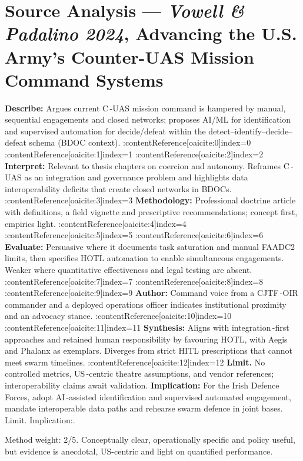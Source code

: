 \section*{Source Analysis — \textit{Vowell \& Padalino 2024}, Advancing the U.S. Army’s Counter-UAS Mission Command Systems}
\textbf{Describe:} Argues current C\,-UAS mission command is hampered by manual, sequential engagements and closed networks; proposes AI/ML for identification and supervised automation for decide/defeat within the detect–identify–decide–defeat schema (BDOC context). {\small :contentReference[oaicite:0]{index=0} :contentReference[oaicite:1]{index=1} :contentReference[oaicite:2]{index=2}}  
\textbf{Interpret:} Relevant to thesis chapters on coercion and autonomy. Reframes C\,-UAS as an integration and governance problem and highlights data interoperability deficits that create closed networks in BDOCs. {\small :contentReference[oaicite:3]{index=3}}  
\textbf{Methodology:} Professional doctrine article with definitions, a field vignette and prescriptive recommendations; concept first, empirics light. {\small :contentReference[oaicite:4]{index=4} :contentReference[oaicite:5]{index=5} :contentReference[oaicite:6]{index=6}}  
\textbf{Evaluate:} Persuasive where it documents task saturation and manual FAADC2 limits, then specifies HOTL automation to enable simultaneous engagements. Weaker where quantitative effectiveness and legal testing are absent. {\small :contentReference[oaicite:7]{index=7} :contentReference[oaicite:8]{index=8} :contentReference[oaicite:9]{index=9}}  
\textbf{Author:} Command voice from a CJTF\,-OIR commander and a deployed operations officer indicates institutional proximity and an advocacy stance. {\small :contentReference[oaicite:10]{index=10} :contentReference[oaicite:11]{index=11}}  
\textbf{Synthesis:} Aligns with integration\,-first approaches and retained human responsibility by favouring HOTL, with Aegis and Phalanx as exemplars. Diverges from strict HITL prescriptions that cannot meet swarm timelines. {\small :contentReference[oaicite:12]{index=12}}  
\textbf{Limit.} No controlled metrics, US\,-centric theatre assumptions, and vendor references; interoperability claims await validation.  
\textbf{Implication:} For the Irish Defence Forces, adopt AI\,-assisted identification and supervised automated engagement, mandate interoperable data paths and rehearse swarm defence in joint bases. Limit. Implication:.


Method weight: 2/5. Conceptually clear, operationally specific and policy useful, but evidence is anecdotal, US-centric and light on quantified performance.

